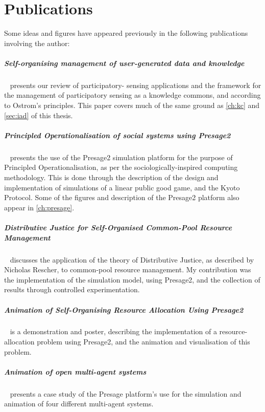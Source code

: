 \chapter*{Publications}
Some ideas and figures have appeared previously in the following publications involving the author:

\bigskip

\paragraph{Self-organising management of user-generated data and
knowledge}~\citep{MacbethKER2014}  presents our review of participatory-
sensing applications and the framework for the management of participatory
sensing as a knowledge commons, and according to Ostrom's principles. This
paper covers much of the same ground as \autoref{ch:kc} and \autoref{sec:iad}
of this thesis.

\paragraph{Principled Operationalisation of social systems using
Presage2}~\citep{Macbeth2014}  presents the use of the Presage2 simulation
platform for the purpose of Principled Operationalisation, as per the
sociologically-inspired computing methodology. This is done through the
description of the design and implementation of simulations of a linear public
good game, and the Kyoto Protocol. Some of the figures and description of the
Presage2 platform also appear in \autoref{ch:presage}.

\paragraph{Distributive Justice for Self-Organised Common-Pool Resource
Management}~\citep{Pitt2014}  discusses the application of the theory of
Distributive Justice, as described by Nicholas Rescher, to common-pool
resource management. My contribution was the implementation of the simulation
model, using Presage2, and the collection of results through controlled
experimentation.

\paragraph{Animation of Self-Organising Resource Allocation Using
Presage2}~\citep{Macbeth2012}  is a demonstration and poster, describing the
implementation of a resource-allocation problem using Presage2, and the
animation and visualisation of this problem.

\paragraph{Animation of open multi-agent systems}~\citep{Pitt2011}  presents a
case study of the Presage platform's use for the simulation and animation of
four different multi-agent systems.
